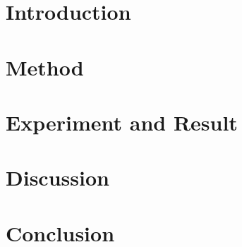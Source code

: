 
\chapter{Introduction} \label{ch:introduction}
	

\chapter{Method} \label{ch:method}
	

\chapter{Experiment and Result} \label{ch:experiment_and_result}
	

\chapter{Discussion} \label{ch:discussion}
	

\chapter{Conclusion} \label{ch:conclusion}
	